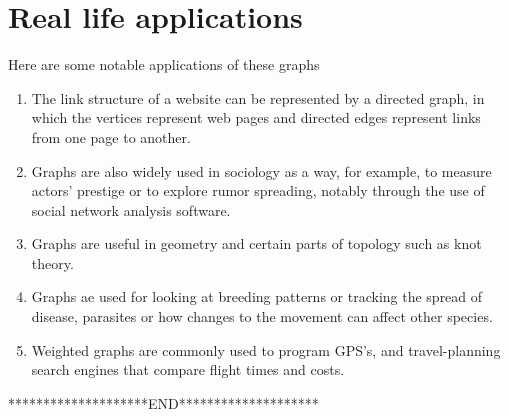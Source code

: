 \documentclass[a4paper,11pt]{article}
\begin{document}
          \section{Real life applications}{Here are some notable applications of these graphs
   \begin{enumerate}
       \item The link structure of a website can be represented by a directed graph, in which the vertices represent web pages and directed edges represent links from one page to another. 
       \item Graphs are also widely used in sociology as a way, for example, to measure actors' prestige or to explore rumor spreading, notably through the use of social network analysis software.
       \item Graphs are useful in geometry and certain parts of topology such as knot theory. 
       \item Graphs ae used for looking at breeding patterns or tracking the spread of disease, parasites or how changes to the movement can affect other species.
       \item Weighted graphs are commonly used to program GPS's, and travel-planning search engines that compare flight times and costs.
   \end{enumerate}}
   \begin{center}
   ********************END********************
   \end{center}
   
\end{document}
